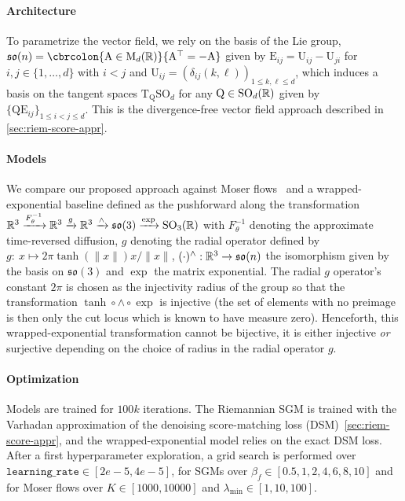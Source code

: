 \paragraph{Architecture}
To parametrize the vector field, we rely on the basis of the Lie group, $\mathfrak{so}(n)= \cbrcolon{\mathrm{A} \in \mathrm{M}_d(\R)}{\mathrm{A}^\top = -\mathrm{A} }$ given by $\mathrm{E}_{ij} = \mathrm{U}_{ij} - \mathrm{U}_{ji}$ for $i, j \in \{1, \dots, d\}$ with $i < j$ and $\mathrm{U}_{ij} = (\delta_{ij}(k,\ell))_{1\leq k, \ell \leq d}$, which induces a basis on the tangent spaces $\mathrm{T}_{\mathrm{Q}} \mathrm{SO}_d$ for any $\mathrm{Q} \in \mathrm{SO}_d(\mathbb{R})$ given by $\{\mathrm{Q} \mathrm{E}_{ij}\}_{1 \leq i<j \leq d}$.
This is the divergence-free vector field approach described in \cref{sec:riem-score-appr}.

\paragraph{Models}
We compare our proposed approach against Moser flows~\parencite{rozen2021moser} and a wrapped-exponential baseline \parencite{falorsi2019reparameterizing} defined as the pushforward along the transformation $\mathbb{R}^3 \xrightarrow[]{F^{-1}_\theta} \mathbb{R}^3 \xrightarrow[]{g} \mathbb{R}^3 \xrightarrow[]{\wedge} \mathfrak{so}(3) \xrightarrow[]{\exp} \mathrm{SO}_3(\mathbb{R})$ with $F^{-1}_\theta$ denoting the approximate time-reversed diffusion, $g$ denoting the radial operator defined by $g: \ x \mapsto 2\pi \tanh(\|x\|) x / \|x\|$, $(\cdot)^{\wedge} : \mathbb{R}^3 \rightarrow \mathfrak{so}(n)$ the isomorphism given by the basis on $\mathfrak{so}(3)$ and $\exp$ the matrix exponential.
The radial $g$ operator's constant $2\pi$ is chosen as the injectivity radius of the group so that the transformation $\tanh \circ \wedge \circ \exp$ is injective (the set of elements with no preimage is then only the cut locus which is known to have measure zero).
Henceforth, this wrapped-exponential transformation cannot be bijective, it is either injective \emph{or} surjective depending on the choice of radius in the radial operator $g$.

\paragraph{Optimization}
Models are trained for $100k$ iterations.
The Riemannian SGM is trained with the Varhadan approximation of the denoising score-matching loss (DSM)~\cref{sec:riem-score-appr}, and the wrapped-exponential model relies on the exact DSM loss.
After a first hyperparameter exploration, a grid search is performed over $\texttt{learning\_rate} \in [2e-5, 4e-5]$, for SGMs over $\beta_f \in [0.5, 1, 2, 4, 6, 8, 10]$ and for Moser flows over $K \in [1000, 10000]$ and $\lambda_{\min} \in [1, 10, 100]$.

